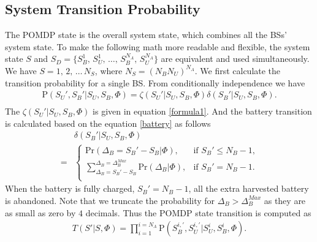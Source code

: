 \documentclass[conference]{IEEEtran}
\begin{document}
\subsection{System Transition Probability}
The POMDP state is the overall system state, which combines all the BSs' system state.
To make the following math more readable and flexible,
the system state \(S\) and \(S_D = \{S_B^1,\,S_U^1,\,\ldots,\,S_B^{N_A},\,S_U^{N_A}\}\)
are equivalent and used simultaneously.
We have \(S = 1,\,2,\, \ldots\,N_S\), where \(N_S = \left(N_BN_U\right)^{N_A}\).
We first calculate the transition probability for a single BS.
From conditionally independence we have
\begin{equation}
\begin{aligned}
	\mbox{P}\left(S_U',S_B'|S_U,S_B,\Phi\right) =
	\zeta\left(S_U'|S_U, S_B, \Phi\right) \delta\left(S_B'|S_U, S_B, \Phi\right).\\
\end{aligned}
\end{equation}
The \(\zeta\left(S_U'|S_U, S_B, \Phi\right)\) is given in equation \eqref{formula1}.
And the battery transition is calculated based on the equation \eqref{battery} as follows
\begin{align}
	&\delta\left(S_B'|S_U, S_B, \Phi\right)\nonumber\\
	= &
	\begin{cases}
		\mbox{Pr}\left(\Delta_B = S_B' - S_B|\Phi \right), &\mbox{if $S_B' \le N_B - 1$,}\\
		\sum_{\Delta_B = S_B' - S_B}^{\Delta_B = \Delta_B^{Max}}\mbox{Pr}\left(\Delta_B|\Phi\right),
		&\mbox{if $S_B' = N_B - 1$.}\\
\end{cases}
\end{align}
When the battery is fully charged, \(S_B'=N_B - 1\), all the extra harvested battery is abandoned.
Note that we truncate the probability for \(\Delta_B >\Delta_B^{Max}\) as they are as small as zero by \(4\) decimals.
Thus the POMDP state transition is computed as
\begin{align}\label{transition}
	T\left(S'|S,\Phi\right) = \prod_{i = 1}^{i = N_A}\mbox{P}\left(S_B^{i,'}, S_U^{i,'}|S_U^i, S_B^i, \Phi\right).
\end{align}
\end{document}
